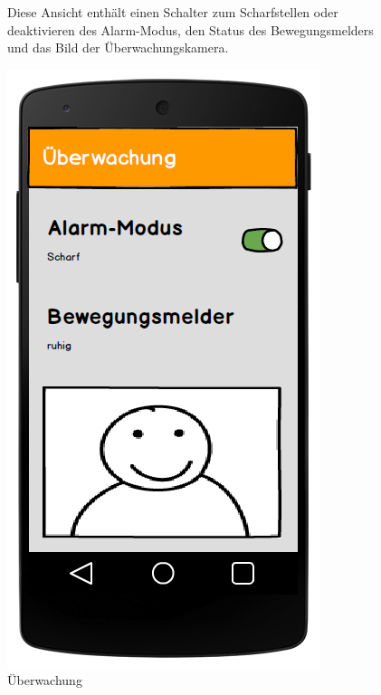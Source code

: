 \begin{figure}[htbp]
	\begin{minipage}{0.6\textwidth} 
Diese Ansicht enthält einen Schalter zum Scharfstellen oder deaktivieren des Alarm-Modus, den Status des Bewegungsmelders und das Bild der Überwachungskamera. 
	\end{minipage}
	\hfill
	\begin{minipage}{0.32\textwidth}
		\includegraphics[width=\textwidth]{report/img/mockup_camera.png}
		\caption{Überwachung}
		\label{fig:mockupCamera}
	\end{minipage}
\end{figure}

